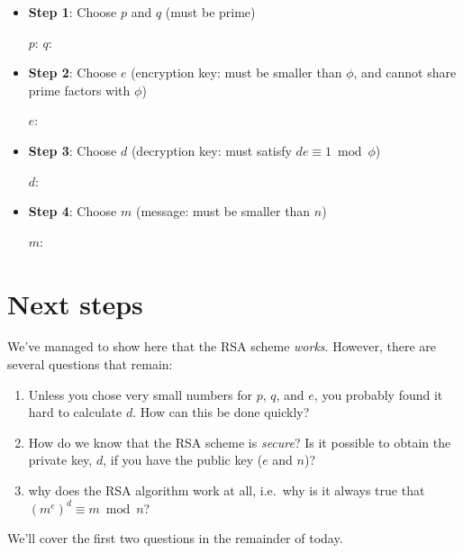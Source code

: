 \documentclass[
  letterpaper,
  DIV=11,
  numbers=noendperiod]{scrreprt}
\providecommand{\tightlist}{%
  \setlength{\itemsep}{0pt}\setlength{\parskip}{0pt}}\usepackage{longtable,booktabs,array}
\begin{document}
\begin{itemize}
\tightlist
\item
  \textbf{Step 1}: Choose \(p\) and \(q\) (must be prime)

  \leavevmode{}%
  \(p\): \(q\): ~~~ ~

  \hypertarget{rsa-pq-out}{}
\item
  \textbf{Step 2}: Choose \(e\) (encryption key: must be smaller than
  \(\phi\), and cannot share prime factors with \(\phi\))

  \leavevmode{}%
  \(e\): ~~~ ~

  \hypertarget{rsa-e-out}{}
\item
  \textbf{Step 3}: Choose \(d\) (decryption key: must satisfy
  \(de \equiv 1 \bmod \phi\))

  \leavevmode{}%
  \(d\): ~~~ ~

  \hypertarget{rsa-d-out}{}
\item
  \textbf{Step 4}: Choose \(m\) (message: must be smaller than \(n\))

  \leavevmode{}%
  \(m\):

  \hypertarget{rsa-m-out}{}
\end{itemize}

\hypertarget{next-steps}{%
\section{Next steps}\label{next-steps}}

We've managed to show here that the RSA scheme \emph{works}. However,
there are several questions that remain:

\begin{enumerate}
\def\labelenumi{\arabic{enumi}.}
\tightlist
\item
  Unless you chose very small numbers for \(p\), \(q\), and \(e\), you
  probably found it hard to calculate \(d\). How can this be done
  quickly?
\item
  How do we know that the RSA scheme is \emph{secure}? Is it possible to
  obtain the private key, \(d\), if you have the public key (\(e\) and
  \(n\))?
\item
  why does the RSA algorithm work at all, i.e.~why is it always true
  that \((m^e)^d \equiv m \bmod n\)?
\end{enumerate}

We'll cover the first two questions in the remainder of today.
\end{document}
